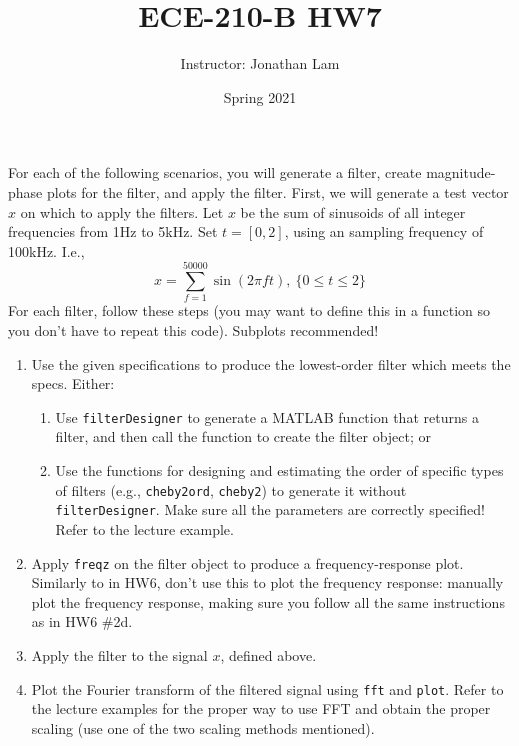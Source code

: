 \documentclass{article}
\title{ECE-210-B HW7}
\author{Instructor: Jonathan Lam}
\date{Spring 2021}
\begin{document}
	\maketitle
	
	\noindent For each of the following scenarios, you will generate a filter, create magnitude-phase plots for the filter, and apply the filter. First, we will generate a test vector $x$ on which to apply the filters. Let $x$ be the sum of sinusoids of all integer frequencies from 1Hz to 5kHz. Set $t=[0,2]$, using an sampling frequency of 100kHz. I.e.,
	\begin{equation*}
		x=\sum_{f=1}^{50000}\sin(2\pi ft),\ \{0\le t\le 2\}
	\end{equation*}
	For each filter, follow these steps (you may want to define this in a function so you don't have to repeat this code). Subplots recommended!
	\begin{enumerate}
		\item Use the given specifications to produce the lowest-order filter which meets the specs. Either:
		\begin{enumerate}
			\item Use \lstinline|filterDesigner| to generate a MATLAB function that returns a filter, and then call the function to create the filter object; or
			\item Use the functions for designing and estimating the order of specific types of filters (e.g., \lstinline|cheby2ord|, \lstinline|cheby2|) to generate it without \lstinline|filterDesigner|. Make sure all the parameters are correctly specified! Refer to the lecture example.
		\end{enumerate}
		
		\item Apply \lstinline|freqz| on the filter object to produce a frequency-response plot. Similarly to in HW6, don't use this to plot the frequency response: manually plot the frequency response, making sure you follow all the same instructions as in HW6 \#2d.
		
		\item Apply the filter to the signal $x$, defined above.
		
		\item Plot the Fourier transform of the filtered signal using \lstinline|fft| and \lstinline|plot|. Refer to the lecture examples for the proper way to use FFT and obtain the proper scaling (use one of the two scaling methods mentioned).
	\end{enumerate}
\end{document}
